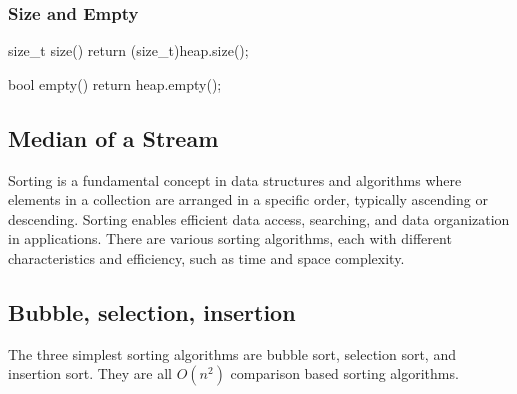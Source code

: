 \documentclass{report}
\begin{document}
\pagebreak 
\subsubsection{Size and Empty}
\bigbreak \noindent 
\begin{cppcode}
    size_t size() {
        return (size_t)heap.size();
    }

    bool empty() {
        return heap.empty();
    }
\end{cppcode}

\pagebreak 
\subsection{Median of a Stream}
\bigbreak \noindent 

\pagebreak 
{}
\bigbreak \noindent 
Sorting is a fundamental concept in data structures and algorithms where elements in a collection are arranged in a specific order, typically ascending or descending. Sorting enables efficient data access, searching, and data organization in applications. There are various sorting algorithms, each with different characteristics and efficiency, such as time and space complexity.
\bigbreak \noindent 
\subsection{Bubble, selection, insertion}
\bigbreak \noindent 
The three simplest sorting algorithms are bubble sort, selection sort, and insertion sort. They are all $O(n^{2})$ comparison based sorting algorithms.
\bigbreak \noindent 
\end{document}

